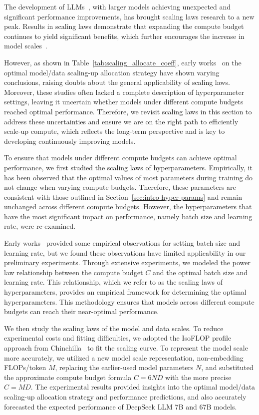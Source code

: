 The development of LLMs~\citep{dai2019transformer,gpt2}, with larger models achieving unexpected and significant performance improvements, has brought scaling laws research to a new peak. Results in scaling laws demonstrate that expanding the compute budget continues to yield significant benefits, which further encourages the increase in model scales~\citep{brown2020language,smith2022using}.

However, as shown in Table~\ref{tab:scaling_allocate_coeff}, early works~\citep{scalinglaw,chinchilla} on the optimal model/data scaling-up allocation strategy have shown varying conclusions, raising doubts about the general applicability of scaling laws. Moreover, these studies often lacked a complete description of hyperparameter settings, leaving it uncertain whether models under different compute budgets reached optimal performance. Therefore, we revisit scaling laws in this section to address these uncertainties and ensure we are on the right path to efficiently scale-up compute, which reflects the long-term perspective and is key to developing continuously improving models.

To ensure that models under different compute budgets can achieve optimal performance, we first studied the scaling laws of hyperparameters. Empirically, it has been observed that the optimal values of most parameters during training do not change when varying compute budgets. Therefore, these parameters are consistent with those outlined in Section~\ref{sec:intro-hyper-params} and remain unchanged across different compute budgets. However, the hyperparameters that have the most significant impact on performance, namely batch size and learning rate, were re-examined.

Early works~\citep{mccandlish2018empirical,shallue2019measuring,smith2017don,goyal2017accurate, zhang2019algorithmic} provided some empirical observations for setting batch size and learning rate, but we found these observations have limited applicability in our preliminary experiments. Through extensive experiments, we modeled the power law relationship between the compute budget $C$ and the optimal batch size and learning rate. This relationship, which we refer to as the scaling laws of hyperparameters, provides an empirical framework for determining the optimal hyperparameters. This methodology ensures that models across different compute budgets can reach their near-optimal performance.

We then study the scaling laws of the model and data scales. To reduce experimental costs and fitting difficulties, we adopted the IsoFLOP profile approach from Chinchilla~\citep{chinchilla} to fit the scaling curve. To represent the model scale more accurately, we utilized a new model scale representation, non-embedding FLOPs/token $M$, replacing the earlier-used model parameters $N$, and substituted the approximate compute budget formula $C=6ND$ with the more precise $C=MD$. The experimental results provided insights into the optimal model/data scaling-up allocation strategy and performance predictions, and also accurately forecasted the expected performance of DeepSeek LLM 7B and 67B models.

